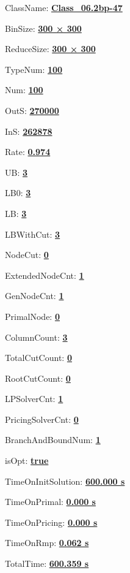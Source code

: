 \documentclass[11pt]{article}
\begin{document}
\pagestyle{empty}


ClassName: \underline{\textbf{Class_06.2bp-47}}
\par
BinSize: \underline{\textbf{300 × 300}}
\par
ReduceSize: \underline{\textbf{300 × 300}}
\par
TypeNum: \underline{\textbf{100}}
\par
Num: \underline{\textbf{100}}
\par
OutS: \underline{\textbf{270000}}
\par
InS: \underline{\textbf{262878}}
\par
Rate: \underline{\textbf{0.974}}
\par
UB: \underline{\textbf{3}}
\par
LB0: \underline{\textbf{3}}
\par
LB: \underline{\textbf{3}}
\par
LBWithCut: \underline{\textbf{3}}
\par
NodeCut: \underline{\textbf{0}}
\par
ExtendedNodeCnt: \underline{\textbf{1}}
\par
GenNodeCnt: \underline{\textbf{1}}
\par
PrimalNode: \underline{\textbf{0}}
\par
ColumnCount: \underline{\textbf{3}}
\par
TotalCutCount: \underline{\textbf{0}}
\par
RootCutCount: \underline{\textbf{0}}
\par
LPSolverCnt: \underline{\textbf{1}}
\par
PricingSolverCnt: \underline{\textbf{0}}
\par
BranchAndBoundNum: \underline{\textbf{1}}
\par
isOpt: \underline{\textbf{true}}
\par
TimeOnInitSolution: \underline{\textbf{600.000 s}}
\par
TimeOnPrimal: \underline{\textbf{0.000 s}}
\par
TimeOnPricing: \underline{\textbf{0.000 s}}
\par
TimeOnRmp: \underline{\textbf{0.062 s}}
\par
TotalTime: \underline{\textbf{600.359 s}}
\par
\newpage
\end{document}
